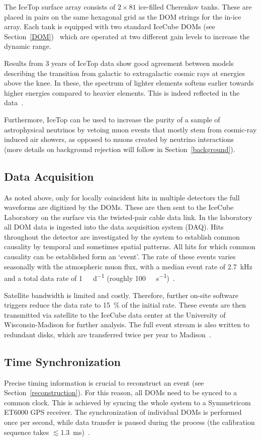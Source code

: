 The IceTop surface array consists of $2\times81$ ice-filled Cherenkov tanks. These are placed in pairs on the same hexagonal grid as the DOM strings for the in-ice array. Each tank is equipped with two standard IceCube DOMs (see Section~\ref{DOM})~\cite{Abbasi2013} which are operated at two different gain levels to increase the dynamic range.

Results from 3 years of IceTop data show good agreement between models describing the transition from galactic to extragalactic cosmic rays at energies above the knee. In these, the spectrum of lighter elements softens earlier towards higher energies compared to heavier elements. This is indeed reflected in the data~.

Furthermore, IceTop can be used to increase the purity of a sample of astrophysical neutrinos by vetoing muon events that mostly stem from cosmic-ray induced air showers, as opposed to muons created by neutrino interactions~ (more details on background rejection will follow in Section~\ref{background}).

\subsection{Data Acquisition}\label{data_acquisition}
As noted above, only for locally coincident hits in multiple detectors the full waveforms are digitized by the DOMs. These are then sent to the IceCube Laboratory on the surface via the twisted-pair cable data link. In the laboratory all DOM data is ingested into the data acquisition system (DAQ). Hits throughout the detector are investigated by the system to establish common causality by temporal and sometimes spatial patterns. All hits for which common causality can be established form an `event'. The rate of these events varies seasonally with the atmospheric muon flux, with a median event rate of \SI{2.7}{\kilo\Hz} and a total data rate of \SI{1}{\tera\byte\per\day} (roughly \SI{100}{\mega\bit\per\second})~\cite{Aartsen2017}.

Satellite bandwidth is limited and costly. Therefore, further on-site software triggers reduce the data rate to \SI{15}{\percent} of the initial rate. These events are then transmitted via satellite to the IceCube data center at the University of Wisconsin-Madison for further analysis. The full event stream is also written to redundant disks, which are transferred twice per year to Madison~\cite{Aartsen2017}.

\subsection{Time Synchronization}
Precise timing information is crucial to reconstruct an event (see Section~\ref{reconstruction}). For this reason, all DOMs need to be synced to a common clock. This is achieved by syncing the whole system to a Symmetricom ET6000 GPS receiver. The synchronization of individual DOMs is performed once per second, while data transfer is paused during the process (the calibration sequence takes $\lesssim$\SI{1.3}{\milli\second})~.


